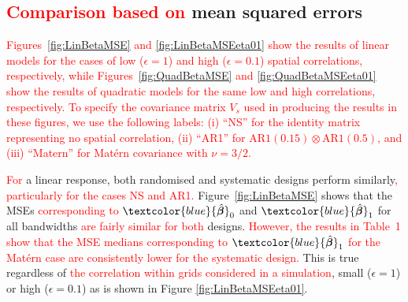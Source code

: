 \documentclass[a4paper]{article} 	%
\newcommand{\Matern}{Mat\'ern }
\newcommand{\AR}{\mathrm{AR1}}
\newcommand{\revision}[1]{\textcolor{red}{#1}}
\newcommand{\zc}[1]{\textcolor{blue}{#1}}
\begin{document}

\subsection{\revision{Comparison based on} mean squared errors}\label{Sec:MSE}


\revision{Figures~\ref{fig:LinBetaMSE} and \ref{fig:LinBetaMSEeta01} show the results of linear models for the cases of low ($\epsilon = 1$) and high ($\epsilon = 0.1$) spatial correlations, respectively, while Figures~\ref{fig:QuadBetaMSE} and \ref{fig:QuadBetaMSEeta01} show the results of quadratic models for the same low and high correlations, respectively. To specify the covariance matrix $V_s$ used in producing the results in these figures, we use the following labels: (i) ``NS'' for the identity matrix representing no spatial correlation, (ii) ``AR1'' for $\AR(0.15)\otimes \AR(0.5)$, and (iii) ``Matern'' for \Matern covariance with $\nu=3/2$.}




\revision{For} a linear response, both randomised and systematic designs perform similarly\revision{, particularly for the cases NS and AR1.} Figure~\ref{fig:LinBetaMSE} shows that the MSEs \revision{corresponding to} $\zc{\hat{\bm{\beta}}}_0$ and $\zc{\hat{\bm{\beta}}}_1$ for all bandwidths \revision{are fairly similar for both} designs. \revision{However, the results in Table~1 show that the MSE medians corresponding to $\zc{\hat{\bm{\beta}}}_1$ for the \Matern case are consistently lower for the systematic design.} 
This is true regardless of \revision{the correlation within grids considered in a simulation}, small ($\epsilon=1$) or high ($\epsilon=0.1$) as is shown in Figure \ref{fig:LinBetaMSEeta01}. %
\end{document}
